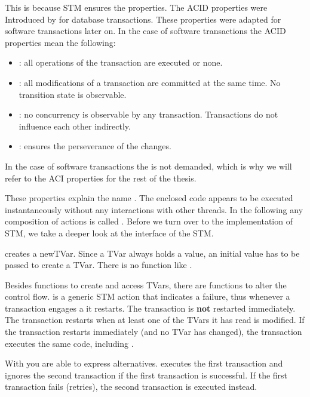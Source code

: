This is because STM ensures the  properties. The ACID properties were Introduced by \parencite{DBTrans} for
database transactions. These properties were adapted for software transactions later on.
In the case of software transactions the ACID properties mean the following:
\begin{itemize}
 \item {}: all operations of the transaction are executed or none.
 \item {}: all modifications of a transaction are committed at the same time. No transition state is observable.
 \item {}: no concurrency is observable by any transaction. Transactions do not influence each other indirectly.
 \item {}: ensures the perseverance of the changes.
\end{itemize}
In the case of software transactions the  is not demanded, which is why we will refer to the ACI properties
for the rest of the thesis.

These properties explain the name . The enclosed code appears to be executed instantaneously without any 
interactions with other threads. In the following any composition of  actions is called .
Before we turn over to the implementation of STM, we take a deeper look at the interface of the STM.

 creates a newTVar. Since a TVar always holds a value, an initial value has to be
passed to create a TVar. There is no function like . 

Besides functions to create and access TVars, there are functions to alter the control flow.
 is a generic STM action that indicates a failure, thus whenever a transaction engages a  it restarts. The transaction
is \textbf{not} restarted immediately. The transaction restarts when at least one of the TVars it has read is modified. If the transaction 
restarts immediately (and no TVar has changed), the transaction executes the same code, including . 

With  you are able to express alternatives.  executes the first transaction
and ignores the second transaction if the first transaction is successful. If the first transaction fails (retries), the second transaction is 
executed instead.

